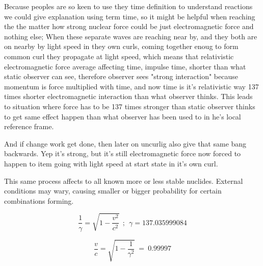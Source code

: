 Because peoples are so keen to use they time definition to understand reactions
we could give explanation using term time, so it might be helpful when reaching
the the matter how strong nuclear force could be just electromagnetic force and
nothing else; When these separate waves are reaching near by, and they both are
on nearby by light speed in they own curls, coming together enoug to form
common curl they propagate at light speed, which means that relativistic
electromagnetic force average affecting time, impulse time, shorter than what
static observer can see, therefore observer sees "strong interaction" because
momentum is force multiplied with time, and now time is it's relativistic way
137\cite{FineStructureConst} times shorter electromagnetic interaction than what
observer thinks. This leads to situation where force has to be 137 times
stronger than static observer thinks to get same effect happen
\cite{TimeDilation} than what observer has been used to in he's local reference
frame.

And if change work get done, then later on uncurlig also give that same bang
backwards. Yep it's strong, but it's still electromagnetic force now forced to
happen to item going with light speed at start state in it's own curl.

This same process affects to all known more or less stable nuclides\cite{Nuclides}.
External conditions may wary, causing smaller or bigger probability for certain
combinations forming.

\begin{equation} \label{eq:clock_rate} %
 \frac{1}{\gamma}=\sqrt{1-\frac{v^2}{c^2}}~~;~~\gamma=137.035999084
\end{equation}




\begin{equation} \label{eq:speed}
	\frac{v}{c}=\sqrt{1-\frac{1}{\gamma^2}} ~=~ 0.99997
\end{equation}

